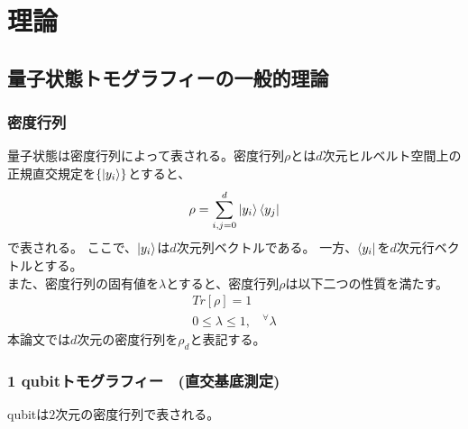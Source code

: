 \documentclass[11pt,a4j,notitlepage]{jreport}
\begin{document}
	\chapter{理論}
	\section{量子状態トモグラフィーの一般的理論}


	\subsection{密度行列}

	量子状態は密度行列によって表される。密度行列$\rho$とは$d$次元ヒルベルト空間上の正規直交規定を$\{ \ket{y_i} \}$とすると、
	\begin{equation}
		\rho = \sum_{i,j = 0}^d \ket{y_i} \bra{y_j}
	\end{equation}
	で表される。
	ここで、$\ket{y_i}$は$d$次元列ベクトルである。
	一方、$\bra{y_i}$を$d$次元行ベクトルとする。\\
	また、密度行列の固有値を$\lambda$とすると、密度行列$\rho$は以下二つの性質を満たす。
	\begin{equation}
		\begin{gathered}
			Tr[\rho]=1 \\
			0 \leq \lambda \leq 1, \ \ \ \  ^\forall \lambda
		\end{gathered}
	\end{equation}
	本論文では$d$次元の密度行列を$\rho_d$と表記する。



	\subsection{1 qubitトモグラフィー　(直交基底測定)}

	qubitは$2$次元の密度行列で表される。
\end{document}
